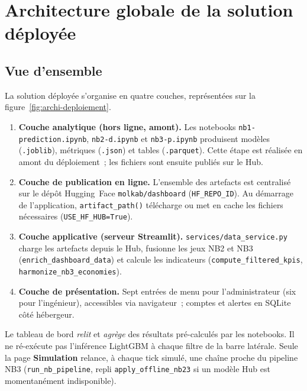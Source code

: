 \section{Architecture globale de la solution déployée}
\label{sec:dep-archi}

\subsection{Vue d'ensemble}
\label{subsec:dep-vue-ensemble}

La solution déployée s'organise en quatre couches, représentées sur la
figure~\ref{fig:archi-deploiement}.

\begin{enumerate}
  \item \textbf{Couche analytique (hors ligne, amont).}
    Les notebooks \texttt{nb1-prediction.ipynb}, \texttt{nb2-d.ipynb} et
    \texttt{nb3-p.ipynb} produisent modèles (\texttt{.joblib}), métriques
    (\texttt{.json}) et tables (\texttt{.parquet}). Cette étape est réalisée
    en amont du déploiement~; les fichiers sont ensuite publiés sur le Hub.

  \item \textbf{Couche de publication en ligne.}
    L'ensemble des artefacts est centralisé sur le dépôt Hugging~Face
    \texttt{molkab/dashboard} (\texttt{HF\_REPO\_ID}). Au démarrage de
    l'application, \texttt{artifact\_path()} télécharge ou met en cache les
    fichiers nécessaires (\texttt{USE\_HF\_HUB=True}).

  \item \textbf{Couche applicative (serveur Streamlit).}
    \texttt{services/data\_service.py} charge les artefacts depuis le Hub,
    fusionne les jeux NB2 et NB3 (\texttt{enrich\_dashboard\_data}) et calcule
    les indicateurs (\texttt{compute\_filtered\_kpis},
    \texttt{harmonize\_nb3\_economies}).

  \item \textbf{Couche de présentation.}
    Sept entrées de menu pour l'administrateur (six pour l'ingénieur), accessibles
    via navigateur~; comptes et alertes en SQLite côté hébergeur.
\end{enumerate}

Le tableau de bord \emph{relit} et \emph{agrège} des résultats pré-calculés par
les notebooks. Il ne ré-exécute pas l'inférence LightGBM à chaque filtre de la
barre latérale. Seule la page \textbf{Simulation} relance, à chaque tick simulé,
une chaîne proche du pipeline NB3 (\texttt{run\_nb\_pipeline}, repli
\texttt{apply\_offline\_nb23} si un modèle Hub est momentanément indisponible).

